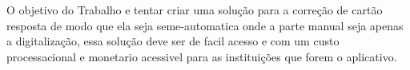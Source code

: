 O objetivo do Trabalho e tentar criar uma solução para a correção de cartão resposta de modo que ela seja seme-automatica onde a parte manual seja apenas a digitalização, essa solução deve ser de facil acesso e com um custo processacional e monetario acessivel para as instituições que forem o aplicativo.